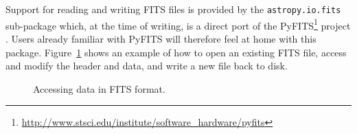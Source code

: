 \documentclass[traditabstract]{aa}
\begin{document}

\label{sec:fits}

Support for reading and writing FITS files is provided by the
\texttt{astropy.io.fits} sub-package which, at the time of writing, is a
direct port of the
PyFITS\footnote{\url{http://www.stsci.edu/institute/software_hardware/pyfits}}
project \citep{barrett1999pyfits}. Users already familiar with PyFITS will
therefore feel at home with this package. Figure~\ref{code:fits} shows an example of how to
open an existing FITS file, access and modify the header and data, and write a new file back to disk.

\begin{figure}
\caption{Accessing data in FITS format.\label{code:fits}}
\end{figure}
\end{document}
